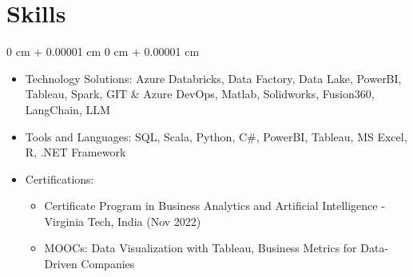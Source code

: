 \documentclass[10pt, letterpaper]{article}
\newenvironment{onecolentry}{
    \begin{adjustwidth}{
        0 cm + 0.00001 cm
    }{
        0 cm + 0.00001 cm
    }
}{
    \end{adjustwidth}
} %
\begin{document}
    
\section{Skills}

\begin{onecolentry}
\begin{itemize}
    \item Technology Solutions: Azure Databricks, Data Factory, Data Lake, PowerBI, Tableau, Spark, GIT \& Azure DevOps, Matlab, Solidworks, Fusion360, LangChain, LLM
    \item Tools and Languages: SQL, Scala, Python, C\#, PowerBI, Tableau, MS Excel, R, .NET Framework
    \item Certifications:
    \begin{itemize}
        \item Certificate Program in Business Analytics and Artificial Intelligence - Virginia Tech, India (Nov 2022)
        \item MOOCs: Data Visualization with Tableau, Business Metrics for Data-Driven Companies
    \end{itemize}
\end{itemize}
\end{onecolentry}
    


    
\end{document}
